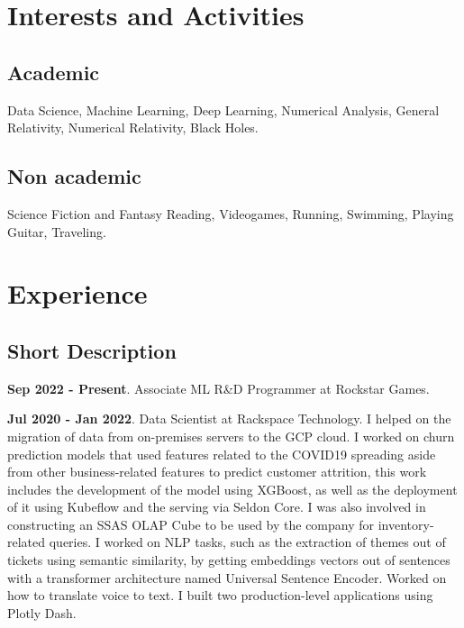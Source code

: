 \documentclass[a4paper,10pt]{article} %
\begin{document}
\bigskip
\section{Interests and Activities}
\bigskip
\subsection*{Academic}
Data Science, Machine Learning, Deep Learning, Numerical Analysis, General Relativity, Numerical Relativity, Black Holes.
\subsection*{Non academic}
Science Fiction and Fantasy Reading, Videogames, Running, Swimming, Playing Guitar, Traveling. 
\bigskip

\section{Experience}
\bigskip

\subsection{Short Description}
\vspace{0.2cm}
\textbf{Sep 2022 - Present}. Associate ML R&D Programmer at Rockstar Games. 

\textbf{Jul 2020 - Jan 2022}. Data Scientist at Rackspace Technology. I helped on the migration of data from on-premises servers to the GCP cloud. I worked on churn prediction models that used features related to the COVID19 spreading aside from other business-related features to predict customer attrition, this work includes the development of the model using XGBoost, as well as the deployment of it using Kubeflow and the serving via Seldon Core. I was also involved in constructing an SSAS OLAP Cube to be used by the company for inventory-related queries. I worked on NLP tasks, such as the extraction of themes out of tickets using semantic similarity, by getting embeddings vectors out of sentences with a transformer architecture named Universal Sentence Encoder. Worked on how to translate voice to text. I built two production-level applications using Plotly Dash.
\end{document}
